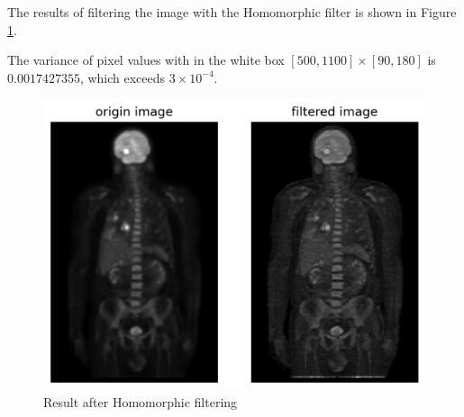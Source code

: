 The results of filtering the image with the Homomorphic filter is shown in Figure \ref{fig:p2_result}.

The variance of pixel values with in the white box $[500, 1100]\times[90, 180]$ is $0.0017427355$, which exceeds $3\times 10^{-4}$.\\



\begin{figure}[htbp]
    \centering
	\includegraphics[width=\textwidth]{../images/p2/p2a_result.png}
    \caption{Result after Homomorphic filtering}
    \label{fig:p2_result}
\end{figure}




\newpage